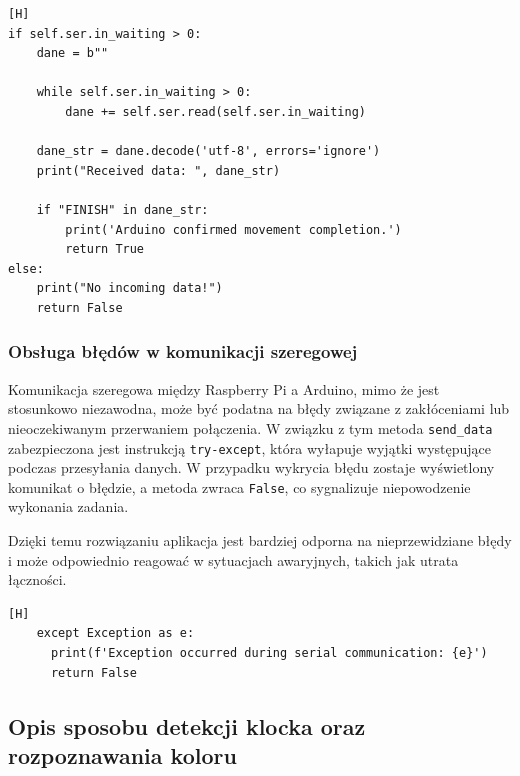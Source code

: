 \vspace*{0.5cm}


\begin{lstlisting}[caption=Kod odbierający dane potwierdzające zakończenie zadania, label=fig:serial_receive, captionpos=b][H]
if self.ser.in_waiting > 0:
    dane = b"" 

    while self.ser.in_waiting > 0:
        dane += self.ser.read(self.ser.in_waiting)
        
    dane_str = dane.decode('utf-8', errors='ignore')
    print("Received data: ", dane_str)  

    if "FINISH" in dane_str:
        print('Arduino confirmed movement completion.')
        return True
else:   
    print("No incoming data!")
    return False
\end{lstlisting}


\subsubsection*{Obsługa błędów w komunikacji szeregowej}

Komunikacja szeregowa między Raspberry Pi a Arduino, mimo że jest stosunkowo niezawodna, może być podatna na błędy związane z zakłóceniami lub nieoczekiwanym przerwaniem połączenia. W związku z tym metoda \texttt{send\_data} zabezpieczona jest instrukcją \texttt{try-except}, która wyłapuje wyjątki występujące podczas przesyłania danych. W przypadku wykrycia błędu zostaje wyświetlony komunikat o błędzie, a metoda zwraca \texttt{False}, co sygnalizuje niepowodzenie wykonania zadania.

Dzięki temu rozwiązaniu aplikacja jest bardziej odporna na nieprzewidziane błędy i może odpowiednio reagować w sytuacjach awaryjnych, takich jak utrata łączności.

\vspace*{0.5cm}


\begin{lstlisting}[caption=Obsługa błędów komunikacji szeregowej, label=fig:serial_exception, captionpos=b][H]
    except Exception as e:
      print(f'Exception occurred during serial communication: {e}')
      return False
\end{lstlisting}


\subsection{Opis sposobu detekcji klocka oraz rozpoznawania koloru}


